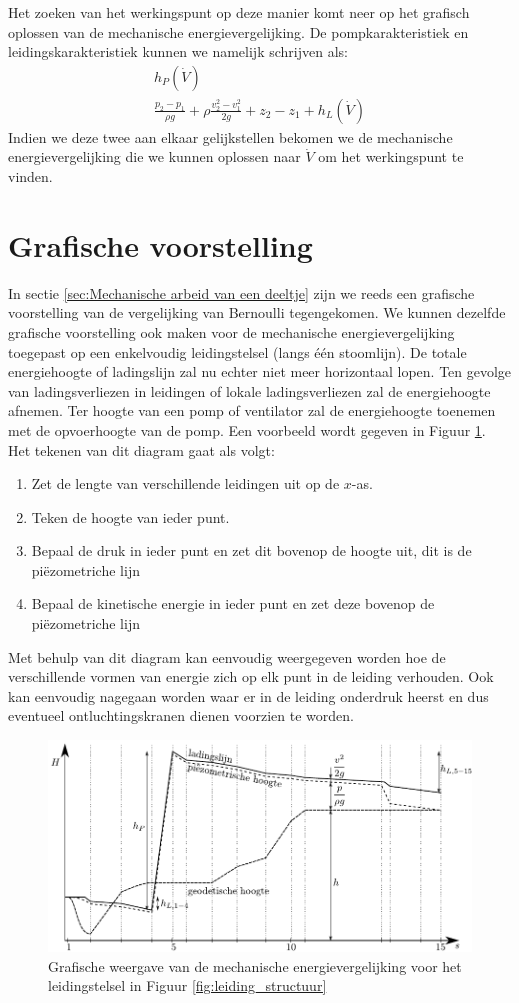 Het zoeken van het werkingspunt op deze manier komt neer op het grafisch oplossen van de mechanische energievergelijking. De pompkarakteristiek en leidingskarakteristiek kunnen we namelijk schrijven als:
\begin{eqnarray}
	h_P(\dot{V}) \\
	\frac{p_2-p_1}{\rho g} + \rho \frac{v_2^2-v_1^2}{2 g}  + z_2-z_1 + h_L(\dot{V})
\end{eqnarray}
Indien we deze twee aan elkaar gelijkstellen bekomen we de mechanische energievergelijking die we kunnen oplossen naar $\dot{V}$ om het werkingspunt te vinden.

		\section{Grafische voorstelling}
In sectie \ref{sec:Mechanische arbeid van een deeltje} zijn we reeds een grafische voorstelling van de vergelijking van Bernoulli tegengekomen. We kunnen dezelfde grafische voorstelling ook maken voor de mechanische energievergelijking toegepast op een enkelvoudig leidingstelsel (langs één stoomlijn). De totale energiehoogte of ladingslijn zal nu echter niet meer horizontaal lopen. Ten gevolge van ladingsverliezen in leidingen of lokale ladingsverliezen zal de energiehoogte afnemen. Ter hoogte van een pomp of ventilator zal de energiehoogte toenemen met de opvoerhoogte van de pomp. Een voorbeeld wordt gegeven in Figuur \ref{fig:leidingstelsel_energiehoogte}. Het tekenen van dit diagram gaat als volgt:
\begin{enumerate}
	\item Zet de lengte van verschillende leidingen uit op de $x$-as.
	\item Teken de hoogte van ieder punt.
	\item Bepaal de druk in ieder punt en zet dit bovenop de hoogte uit, dit is de piëzometriche lijn
	\item Bepaal de kinetische energie in ieder punt en zet deze bovenop de piëzometriche lijn
\end{enumerate}
Met behulp van dit diagram kan eenvoudig weergegeven worden hoe de verschillende vormen van energie zich op elk punt in de leiding verhouden. Ook kan eenvoudig nagegaan worden waar er in de leiding onderdruk heerst en dus eventueel ontluchtingskranen dienen voorzien te worden.
\begin{figure}
	\centering
	\includegraphics{fig/leidingstelsels/leidingstelsel_energiehoogte}
	\caption{Grafische weergave van de mechanische energievergelijking voor het leidingstelsel in Figuur \ref{fig:leiding_structuur}}
	\label{fig:leidingstelsel_energiehoogte}
\end{figure}


